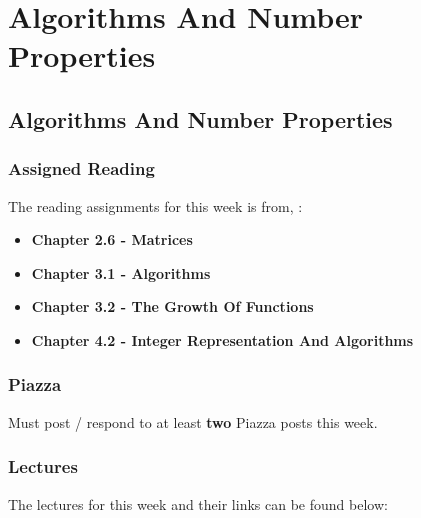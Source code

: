 \clearpage

\renewcommand{\ChapTitle}{Algorithms And Number Properties}
\renewcommand{\SectionTitle}{Algorithms And Number Properties}

\chapter{\ChapTitle}
\section{\SectionTitle}

\subsection{Assigned Reading}

The reading assignments for this week is from, \Textbook:

\begin{itemize}
    \item \textbf{Chapter 2.6 - Matrices}
    \item \textbf{Chapter 3.1 - Algorithms}
    \item \textbf{Chapter 3.2 - The Growth Of Functions}
    \item \textbf{Chapter 4.2 - Integer Representation And Algorithms}
\end{itemize}

\subsection{Piazza}

Must post / respond to at least \textbf{two} Piazza posts this week.

\subsection{Lectures}

The lectures for this week and their links can be found below:

